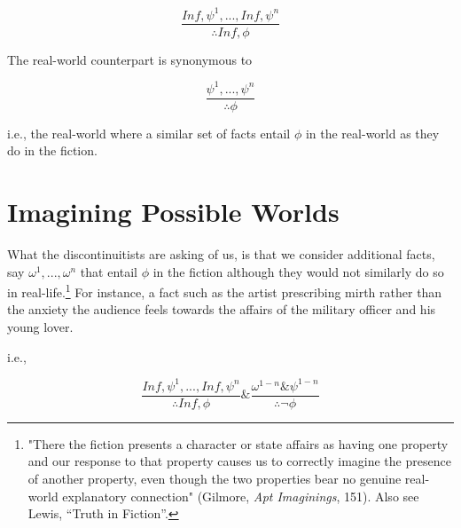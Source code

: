 \documentclass[phdthesis,12pt,final,a4paper]{wuthesis}
\theoremstyle{definition}
\theoremstyle{definition}
\theoremstyle{definition}
\theoremstyle{definition}
\theoremstyle{remark}
\begin{document}
\[\frac{In f, \psi^{1}, . . ., In f, \psi^{n}}{\therefore In f, \phi}\]

\noindent The real-world counterpart is synonymous to

\[\frac{\psi^{1}, . . ., \psi^{n}}{\therefore\phi}\]

\noindent i.e., the real-world where a similar set of facts entail \(\phi\) in the real-world as they do in the fiction.

\section{Imagining Possible Worlds}\label{imagining-possible-worlds}

What the discontinuitists are asking of us, is that we consider additional facts, say \(\omega^{1}, . . ., \omega^{n}\) that entail \(\phi\) in the fiction although they would not similarly do so in real-life.\footnote{"There the fiction presents a character or state affairs as having one property and our response to that property causes us to correctly imagine the presence of another property, even though the two properties bear no genuine real-world explanatory connection" (Gilmore, \emph{Apt {Imaginings}}, 151). Also see Lewis, {``Truth in {Fiction}''}.} For instance, a fact such as the artist prescribing mirth rather than the anxiety the audience feels towards the affairs of the military officer and his young lover.

\noindent i.e.,

\[\frac{In f, \psi^{1}, . . ., In f, \psi^{n}}{\therefore In f, \phi} \& \frac{\omega^{1-n} \& \psi^{1-n}}{\therefore\neg\phi}\]
\end{document}
